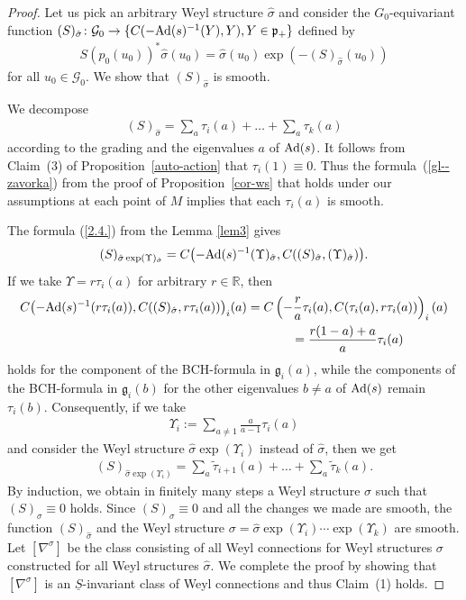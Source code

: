 \documentclass[pdftex]{sigma}
\newcommand{\si}{\sigma}
\newcommand{\un}{\underline}
\newcommand{\ba}{\mathcal{G}}
\newcommand{\fg}{\mathfrak g}
\newcommand{\fp}{\mathfrak p}
\newcommand{\Ad}{{\rm Ad}}
\newcommand{\U}{\Upsilon}
\numberwithin{equation}{section}
\begin{document}
\begin{proof}
Let us pick an arbitrary Weyl structure $\hat \si$ and consider the $G_0$-equivariant function $(S)_{\hat \si}\colon \ba_0\to \{C(-\Ad(s)^{-1}(Y),Y), Y\in \fp_+\}$ def\/ined by \begin{gather*}S(p_0(u_0))^*\hat \si(u_0)=\hat \si(u_0)\exp(-(S)_{\hat \si}(u_0))\end{gather*}
for all $u_0\in \ba_0$. We show that $(S)_{\hat \si}$ is smooth.

We decompose
\begin{gather*}(S)_{\hat \si}=\sum_a\tau_i(a)+\dots+\sum_a\tau_k(a)\end{gather*}
according to the grading and the eigenvalues $a$ of $\Ad(s)$. It follows from Claim~(3) of Proposi\-tion~\ref{auto-action} that $\tau_i(1)\equiv 0$. Thus the formula~(\ref{gl--zavorka}) from the proof of Proposition~\ref{cor-ws} that holds under our assumptions at each point of $M$ implies that each $\tau_i(a)$ is smooth.

The formula (\ref{2.4.}) from the Lemma \ref{lem3} gives \begin{gather*}(S)_{\hat \si\exp (\U)_{\hat \si}}=C\big({-}\Ad(s)^{-1}(\U)_{\hat \si},C((S)_{\hat \si},(\U)_{\hat \si})\big).\end{gather*}
If we take $\U=r\tau_i(a)$ for arbitrary $r\in \mathbb{R}$, then
\begin{gather*}C\big({-}\Ad(s)^{-1}(r \tau_i(a)),C((S)_{\hat \si},r\tau_i(a))\big)_i(a) = C\left(-\frac{r}{a} \tau_i(a),C(\tau_i(a),r\tau_i(a))\right)_i(a)\\
\hphantom{C\big({-}\Ad(s)^{-1}(r \tau_i(a)),C((S)_{\hat \si},r\tau_i(a))\big)_i(a)}{} =
\frac{r(1-a)+a}{a}\tau_i(a)
\end{gather*}
holds for the component of the BCH-formula in $\fg_i(a)$, while the components of the BCH-for\-mu\-la in $\fg_i(b)$ for the other eigenvalues $b\neq a$ of $\Ad(s)$ remain $\tau_i(b)$. Consequently, if we take \begin{gather*}\U_i:=\sum_{a\neq 1} \frac{a}{a-1}\tau_i(a) \end{gather*} and consider the Weyl structure $\hat \si\exp (\U_i)$ instead of $\hat \si$, then we get
\begin{gather*}(S)_{\hat \si\exp (\U_i)}=\sum_a\tilde \tau_{i+1}(a)+\dots+\sum_a\tilde \tau_k(a).\end{gather*}
By induction, we obtain in f\/initely many steps a Weyl structure $\si$ such that $(S)_\si\equiv 0$ holds. Since $(S)_\si\equiv 0$ and all the changes we made are smooth, the function $(S)_{\hat \si}$ and the Weyl structure $\si=\hat \si\exp(\U_i)\cdots \exp(\U_k)$ are smooth.
Let $[\nabla^\si]$ be the class consisting of all Weyl connections for Weyl structures $\si$ constructed for all Weyl structures $\hat \si$. We complete the proof by showing that $[\nabla^\si]$ is an $\un S$-invariant class of Weyl connections and thus Claim~(1) holds.


\end{proof}
\end{document}
